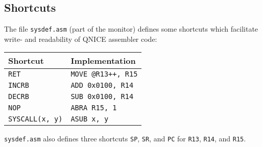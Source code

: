 \documentclass{leaflet}
\begin{document}
  \subsection{Shortcuts}
   The file \texttt{sysdef.asm} (part of the monitor) defines some shortcuts
   which facilitate write- and readability of QNICE assembler code:
   \begin{center}
    \begin{longtable}{|l|l|}
     \hline
      Shortcut&Implementation\\
     \hline
      \texttt{RET}&\texttt{MOVE @R13++, R15}\\
      \texttt{INCRB}&\texttt{ADD 0x0100, R14}\\
      \texttt{DECRB}&\texttt{SUB 0x0100, R14}\\
      \texttt{NOP}&\texttt{ABRA R15, 1}\\
      \texttt{SYSCALL(x, y)}&\texttt{ASUB x, y}\\
     \hline
    \end{longtable}
   \end{center}
   \texttt{sysdef.asm} also defines three shortcuts \texttt{SP}, \texttt{SR},
   and \texttt{PC} for \texttt{R13}, \texttt{R14}, and \texttt{R15}.
%
\end{document}
